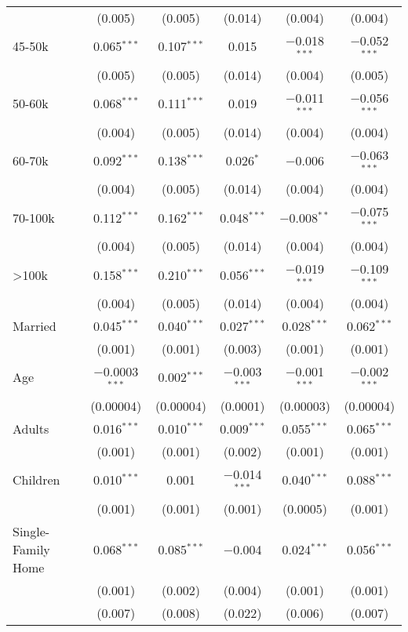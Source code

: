 \begin{table}[!htbp]
\begin{tabular}{@{\extracolsep{5pt}}lccccc}
  & (0.005) & (0.005) & (0.014) & (0.004) & (0.004) \\ 
  45-50k & 0.065$^{***}$ & 0.107$^{***}$ & 0.015 & $-$0.018$^{***}$ & $-$0.052$^{***}$ \\ 
  & (0.005) & (0.005) & (0.014) & (0.004) & (0.005) \\ 
  50-60k & 0.068$^{***}$ & 0.111$^{***}$ & 0.019 & $-$0.011$^{***}$ & $-$0.056$^{***}$ \\ 
  & (0.004) & (0.005) & (0.014) & (0.004) & (0.004) \\ 
  60-70k & 0.092$^{***}$ & 0.138$^{***}$ & 0.026$^{*}$ & $-$0.006 & $-$0.063$^{***}$ \\ 
  & (0.004) & (0.005) & (0.014) & (0.004) & (0.004) \\ 
  70-100k & 0.112$^{***}$ & 0.162$^{***}$ & 0.048$^{***}$ & $-$0.008$^{**}$ & $-$0.075$^{***}$ \\ 
  & (0.004) & (0.005) & (0.014) & (0.004) & (0.004) \\ 
  >100k & 0.158$^{***}$ & 0.210$^{***}$ & 0.056$^{***}$ & $-$0.019$^{***}$ & $-$0.109$^{***}$ \\ 
  & (0.004) & (0.005) & (0.014) & (0.004) & (0.004) \\ 
  Married & 0.045$^{***}$ & 0.040$^{***}$ & 0.027$^{***}$ & 0.028$^{***}$ & 0.062$^{***}$ \\ 
  & (0.001) & (0.001) & (0.003) & (0.001) & (0.001) \\ 
  Age & $-$0.0003$^{***}$ & 0.002$^{***}$ & $-$0.003$^{***}$ & $-$0.001$^{***}$ & $-$0.002$^{***}$ \\ 
  & (0.00004) & (0.00004) & (0.0001) & (0.00003) & (0.00004) \\ 
  Adults & 0.016$^{***}$ & 0.010$^{***}$ & 0.009$^{***}$ & 0.055$^{***}$ & 0.065$^{***}$ \\ 
  & (0.001) & (0.001) & (0.002) & (0.001) & (0.001) \\ 
  Children & 0.010$^{***}$ & 0.001 & $-$0.014$^{***}$ & 0.040$^{***}$ & 0.088$^{***}$ \\ 
  & (0.001) & (0.001) & (0.001) & (0.0005) & (0.001) \\ 
  Single-Family Home & 0.068$^{***}$ & 0.085$^{***}$ & $-$0.004 & 0.024$^{***}$ & 0.056$^{***}$ \\ 
  & (0.001) & (0.002) & (0.004) & (0.001) & (0.001) \\ 
  & (0.007) & (0.008) & (0.022) & (0.006) & (0.007) \\ 

\end{tabular}
\end{table}
